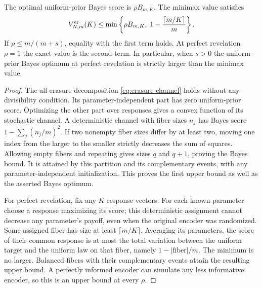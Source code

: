 \begin{proposition}
\label{prop:integer-erasure}
The optimal uniform-prior Bayes score is $\rho B_{m,K}$. The minimax
value satisfies
\begin{equation}\label{eq:integer-bounds}
 V^{\rm er}_{N,m}(K)\le
 \min\left\{\rho B_{m,K},\;1-\frac{\lceil m/K\rceil}{m}\right\}.
\end{equation}
If $\rho\le m/(m+s)$, equality with the first term holds. At perfect
revelation $\rho=1$ the exact value is the second term. In particular,
when $s>0$ the uniform-prior Bayes optimum at perfect revelation is
strictly larger than the minimax value.
\end{proposition}
\begin{proof}
The all-erasure decomposition \eqref{eq:erasure-channel} holds without
any divisibility condition. Its parameter-independent part has zero
uniform-prior score. Optimizing the other part over responses gives a
convex function of its stochastic channel. A deterministic channel with
fiber sizes $n_j$ has Bayes score $1-\sum_j(n_j/m)^2$. If two nonempty
fiber sizes differ by at least two, moving one index from the larger
to the smaller strictly decreases the sum of squares. Allowing empty
fibers and repeating gives sizes $q$ and $q+1$, proving the Bayes bound.
It is attained by this partition and its complementary events, with
any parameter-independent initialization. This proves the first upper
bound as well as the asserted Bayes optimum.

For perfect revelation, fix any $K$ response vectors. For each known
parameter choose a response maximizing its score; this deterministic
assignment cannot decrease any parameter's payoff, even when the
original encoder was randomized. Some assigned fiber has size at least
$\lceil m/K\rceil$. Averaging its parameters, the score of their common
response is at most the total variation between the uniform target
and the uniform law on that fiber, namely $1-|\text{fiber}|/m$.
The minimum is no larger. Balanced fibers with their complementary
events attain the resulting upper bound. A perfectly informed encoder
can simulate any less informative encoder, so this is an upper bound
at every $\rho$.


\end{proof}
